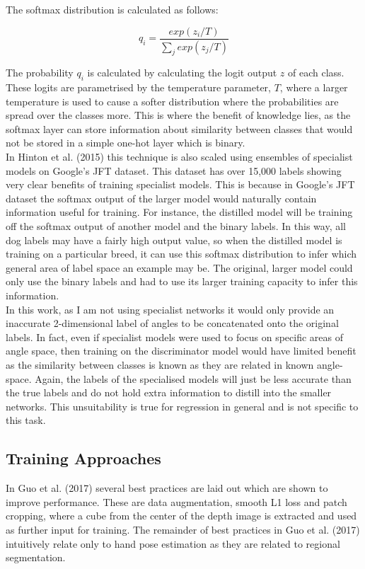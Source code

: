 \documentclass{article}
\begin{document}
The softmax distribution is calculated as follows:

\[q_i = \frac{exp(z_i/T)}{\sum_j exp(z_j/T)}\]

The probability $q_i$ is calculated by calculating the logit output $z$ of each class. These logits are parametrised by the temperature parameter, $T$, where a larger temperature is used to cause a softer distribution where the probabilities are spread over the classes more. This is where the benefit of knowledge lies, as the softmax layer can store information about similarity between classes that would not be stored in a simple one-hot layer which is binary.\\

In Hinton et al. (2015) this technique is also scaled using ensembles of specialist models on Google's JFT dataset. This dataset has over 15,000 labels showing very clear benefits of training specialist models. This is because in Google's JFT dataset the softmax output of the larger model would naturally contain information useful for training. For instance, the distilled model will be training off the softmax output of another model and the binary labels. In this way, all dog labels may have a fairly high output value, so when the distilled model is training on a particular breed, it can use this softmax distribution to infer which general area of label space an example may be. The original, larger model could only use the binary labels and had to use its larger training capacity to infer this information. \\

In this work, as I am not using specialist networks it would only provide an inaccurate 2-dimensional label of angles to be concatenated onto the original labels. In fact, even if specialist models were used to focus on specific areas of angle space, then training on the discriminator model would have limited benefit as the similarity between classes is known as they are related in known angle-space.  Again, the labels of the specialised models will just be less accurate than the true labels and do not hold extra information to distill into the smaller networks. This unsuitability is true for regression in general and is not specific to this task. \\

\subsection{Training Approaches}
In Guo et al. (2017) several best practices are laid out which are shown to improve performance. These are data augmentation, smooth L1 loss and patch cropping, where a cube from the center of the depth image is extracted and used as further input for training. The remainder of best practices in Guo et al. (2017) intuitively relate only to hand pose estimation as they are related to regional segmentation. \\
\end{document}
